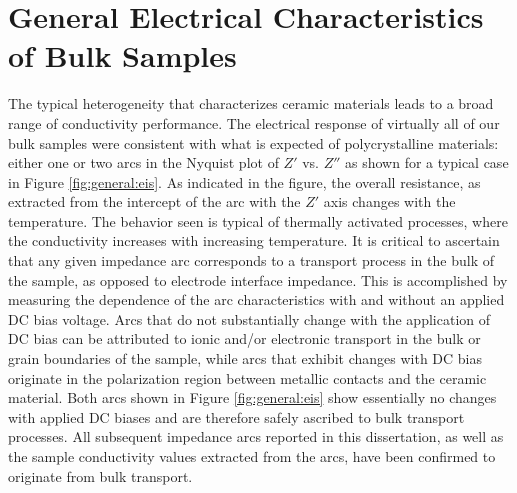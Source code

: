 \vspace{12pt}
\section{General Electrical Characteristics of Bulk Samples}

The typical heterogeneity that characterizes ceramic materials leads to a broad range of conductivity performance. The electrical response of virtually all of our bulk samples were consistent with what is expected of polycrystalline materials: either one or two arcs in the Nyquist plot of $Z'$ vs. $Z''$ as shown for a typical case in Figure \ref{fig:general:eis}. As indicated in the figure, the overall resistance, as extracted from the intercept of the arc with the $Z'$ axis changes with the temperature. The behavior seen is typical of thermally activated processes, where the conductivity increases with increasing temperature. It is critical to ascertain that any given impedance arc corresponds to a transport process in the bulk of the sample, as opposed to electrode interface impedance. This is accomplished by measuring the dependence of the arc characteristics with and without an applied DC bias voltage. Arcs that do not substantially change with the application of DC bias can be attributed to ionic and/or electronic transport in the bulk or grain boundaries of the sample, while arcs that exhibit changes with DC bias originate in the polarization region between metallic contacts and the ceramic material. Both arcs shown in Figure \ref{fig:general:eis} show essentially no changes with applied DC biases and are therefore safely ascribed to bulk transport processes. All subsequent impedance arcs reported in this dissertation, as well as the sample conductivity values extracted from the arcs, have been confirmed to originate from bulk transport.

